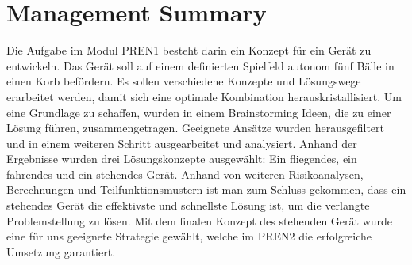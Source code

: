 \section*{Management Summary}
Die Aufgabe im Modul PREN1 besteht darin ein Konzept für ein Gerät zu 
entwickeln. Das Gerät soll auf einem definierten Spielfeld autonom 
fünf Bälle in einen Korb befördern. Es sollen verschiedene Konzepte und 
Lösungswege erarbeitet werden, damit sich eine optimale Kombination herauskristallisiert. 
Um eine Grundlage zu schaffen, wurden in einem Brainstorming Ideen, die zu 
einer Lösung führen, zusammengetragen. Geeignete Ansätze wurden herausgefiltert 
und in einem weiteren Schritt ausgearbeitet und analysiert. Anhand der 
Ergebnisse wurden drei Lösungskonzepte ausgewählt: Ein fliegendes, 
ein fahrendes und ein stehendes Gerät. Anhand von weiteren Risikoanalysen, 
Berechnungen und Teilfunktionsmustern ist man zum Schluss gekommen, dass ein 
stehendes Gerät die effektivste und schnellste Lösung ist, um die verlangte 
Problemstellung zu lösen. Mit dem finalen Konzept des stehenden Gerät wurde 
eine für uns geeignete Strategie gewählt, welche im PREN2 die erfolgreiche 
Umsetzung garantiert.
